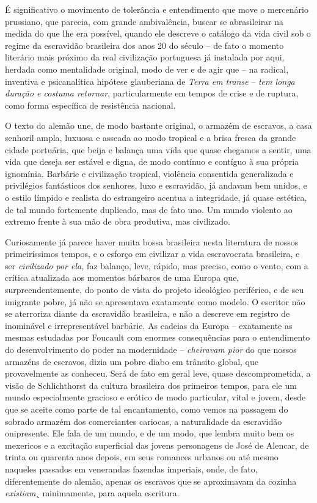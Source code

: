 É significativo o movimento de tolerância e entendimento que move o
mercenário prussiano, que parecia, com grande ambivalência, buscar se
abrasileirar na medida do que lhe era possível, quando ele descreve o
catálogo da vida civil sob o regime da escravidão brasileira dos anos 20
do século  -- de fato o momento literário mais próximo da real
civilização portuguesa já instalada por aqui, herdada como mentalidade
original, modo de ver e de agir que -- na radical, inventiva e
psicanalítica hipótese glauberiana de \emph{Terra em transe} --
\emph{tem longa duração e costuma retornar}, particularmente em tempos
de crise e de ruptura, como forma específica de resistência nacional.

O texto do alemão une, de modo bastante original, o armazém de escravos,
a casa senhoril ampla, luxuosa e asseada ao modo tropical e a brisa
fresca da grande cidade portuária, que beija e balança uma vida que
quase chegamos a sentir, uma vida que deseja ser estável e digna, de
modo contínuo e contíguo à sua própria ignomínia. Barbárie e civilização
tropical, violência consentida generalizada e privilégios fantásticos
dos senhores, luxo e escravidão, já andavam bem unidos, e o estilo
límpido e realista do estrangeiro acentua a integridade, já quase
estética, de tal mundo fortemente duplicado, mas de fato uno. Um mundo
violento ao extremo frente à sua mão de obra produtiva, mas civilizado.

Curiosamente já parece haver muita bossa brasileira nesta literatura de
nossos primeiríssimos tempos, e o esforço em civilizar a vida
escravocrata brasileira, e ser \emph{civilizado por ela,} faz balanço,
leve, rápido, mas preciso, como o vento, com a crítica atualizada aos
momentos bárbaros de uma Europa que, surpreendentemente, do ponto de
vista do projeto ideológico periférico, e de seu imigrante pobre, já não
se apresentava exatamente como modelo. O escritor não se aterroriza
diante da escravidão brasileira, e não a descreve em registro de
inominável e irrepresentável barbárie. As cadeias da Europa --
exatamente as mesmas estudadas por Foucault com enormes consequências
para o entendimento do desenvolvimento do poder na modernidade --
\emph{cheiravam pior} do que nossos armazéns de escravos, dizia um pobre
diabo em trânsito global, que provavelmente as conheceu. Será de fato em
geral leve, quase descomprometida, a visão de Schlichthorst da cultura
brasileira dos primeiros tempos, para ele um mundo especialmente
gracioso e erótico de modo particular, vital e jovem, desde que se
aceite como parte de tal encantamento, como vemos na passagem do sobrado
armazém dos comerciantes cariocas, a naturalidade da escravidão
onipresente. Ele fala de um mundo, e de um modo, que lembra muito bem os
mexericos e a excitação superficial das jovens personagens de José de
Alencar, de trinta ou quarenta anos depois, em seus romances urbanos ou
até mesmo naqueles passados em venerandas fazendas imperiais, onde, de
fato, diferentemente do alemão, apenas os escravos que se aproximavam da
cozinha \emph{existiam}¸ minimamente, para aquela escritura.

